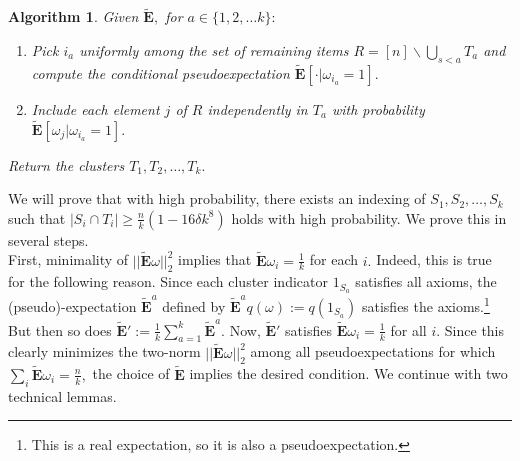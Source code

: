 \documentclass[12pt]{article}%
\newtheorem{algorithm}[theorem]{Algorithm}
\newcommand{\pseudoexpect}{\tilde{\mathbf{E}}}
\begin{document}
\begin{algorithm} Given $\pseudoexpect,$ for $a \in \{1,2,\ldots k\}:$
\begin{enumerate}
    \item Pick $i_a$ uniformly among the set of remaining items $R = [n]\backslash \bigcup_{s<a} T_{a}$ and compute the conditional pseudoexpectation $\pseudoexpect[\cdot|\omega_{i_a} = 1].$
    \item Include each element $j$ of $R$ independently in $T_{a}$ with probability $\pseudoexpect[\omega_j|\omega_{i_a} = 1].$
\end{enumerate}
Return the clusters $T_1, T_2, \ldots, T_k.$
\end{algorithm}


\noindent
We will prove that with high probability, there exists an indexing of $S_1, S_2, \ldots, S_k$ such that 
$|S_i \cap T_i|\ge \frac{n}{k}(1 - 16\delta k^8)$ holds with high probability. We prove this in several steps.\\

\noindent
First, minimality of $||\pseudoexpect \omega||_2^2$ implies that $\pseudoexpect \omega_i = \frac{1}{k}$ for each $i.$ Indeed, this is true for the following reason. Since each cluster indicator $1_{S_a}$ satisfies all axioms, the (pseudo)-expectation $\pseudoexpect^a$ defined by $\pseudoexpect^aq(\omega) := q(1_{S_a})$ satisfies the axioms.\footnote{This is a real
expectation, so it is also a pseudoexpectation.} But
then so does $\pseudoexpect' := \frac{1}{k}\sum_{a =
1}^k \pseudoexpect^a.$ Now, $\pseudoexpect'$ satisfies
$\pseudoexpect \omega_i = \frac{1}{k}$ for all $i.$ Since this clearly minimizes the two-norm $||\pseudoexpect \omega||_2^2$ among all pseudoexpectations for which $\sum_i\pseudoexpect \omega_i = \frac{n}{k},$ the choice of $\pseudoexpect$ implies the desired condition. We continue with two technical lemmas.
\end{document}

